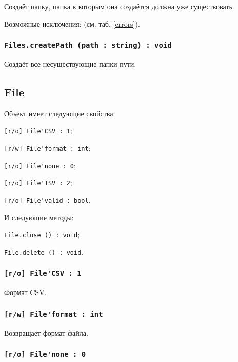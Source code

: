 Создаёт папку, папка в которым она создаётся должна уже существовать.

Возможные исключения:  (см. таб. \ref{errors}).

\subsubsection{\lstinline|Files.createPath (path : string) : void|}

Создаёт все несуществующие папки пути.

\subsection{{\color{orange} File}}

Объект \file{} имеет следующие свойства:
\begin{icItems}
	\item \lstinline|[r/o] File'CSV : 1|;
	\item \lstinline|[r/w] File'format : int|;
	\item \lstinline|[r/o] File'none : 0|;
	\item \lstinline|[r/o] File'TSV : 2|;
	\item \lstinline|[r/o] File'valid : bool|.
\end{icItems}

И следующие методы:
\begin{icItems}
	\item \lstinline|File.close () : void|;
	\item \lstinline|File.delete () : void|.
\end{icItems}

\subsubsection{\lstinline|[r/o] File'CSV : 1|}

Формат CSV.

\subsubsection{\lstinline|[r/w] File'format : int|}

Возвращает формат файла.

\subsubsection{\lstinline|[r/o] File'none : 0|}


